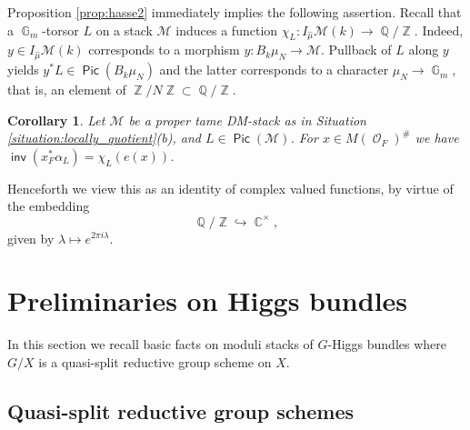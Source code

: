 \documentclass{article}
\DeclareMathOperator{\inv}{\mathsf{inv}}
\DeclareMathOperator{\Cb}{\mathbb{C}}
\DeclareMathOperator{\Zb}{\mathbb{Z}}
\DeclareMathOperator{\G}{\mathbb{G}}
\newcommand{\Mc}{\mathcal{M}}
\DeclareMathOperator{\Oo}{\mathcal{O}}
\DeclareMathOperator{\Qb}{\mathbb{Q}}
\DeclareMathOperator{\Pic}{\mathsf{Pic}}
\theoremstyle{definition}
\theoremstyle{plain}
\newtheorem{corollary}[definition]{Corollary}
\begin{document}
Proposition \ref{prop:hasse2} immediately implies the following assertion. Recall that a $\G_m$-torsor $L$ on a stack $\Mc$ induces a function $\chi_L\colon I_{\widehat{\mu}}\Mc(k) \to \Qb/\Zb$. Indeed, $y \in I_{\widehat{\mu}}\Mc(k)$ corresponds to a morphism $y\colon B_k\mu_N \to \Mc$. Pullback of $L$ along $y$ yields $y^*L \in \Pic(B_k\mu_N)$ and the latter corresponds to a character $\mu_N \to \G_m$, that is, an element of $\Zb/N\Zb \subset \Qb/\Zb$.

\begin{corollary}\label{cor:hasse}
Let $\Mc$ be a proper tame DM-stack as in Situation \ref{situation:locally_quotient}(b), and $L \in \Pic(\Mc)$. For $x \in M(\Oo_F)^{\#}$ we have $\inv(x_F^*\alpha_L) = \chi_L(e(x))$.
\end{corollary}

Henceforth we view this as an identity of complex valued functions, by virtue of the embedding 
$$\Qb/\Zb \hookrightarrow \Cb^{\times},$$
given by $\lambda \mapsto e^{2\pi i \lambda}$.

\section{Preliminaries on Higgs bundles} \label{HiggsBundles}

In this section we recall basic facts on moduli stacks of $G$-Higgs bundles where $G/X$ is a quasi-split reductive group scheme on $X$.

\subsection{Quasi-split reductive group schemes}
\end{document}
